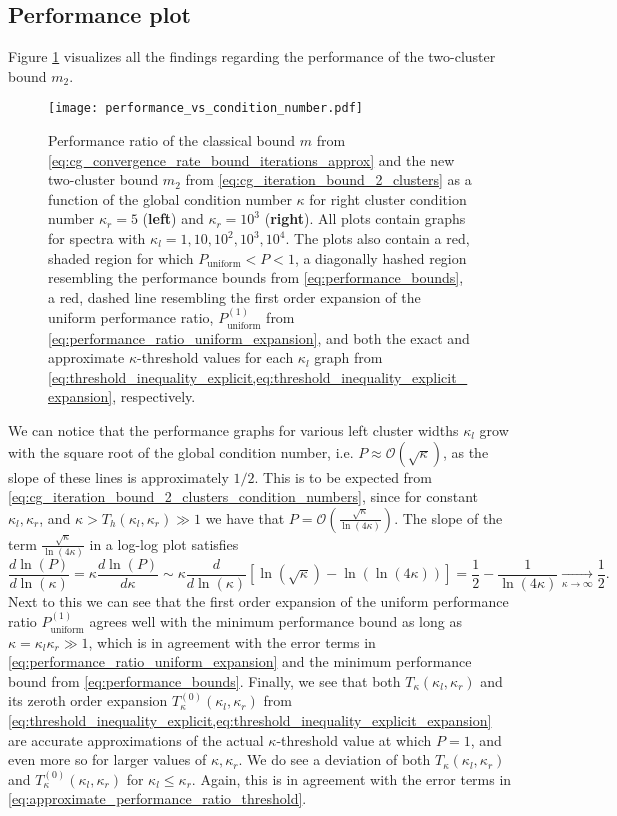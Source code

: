 \subsection{Performance plot}
Figure \ref{fig:two_cluster_bound_performance} visualizes all the findings regarding the performance of the two-cluster bound $m_2$. 
\begin{figure}[H]
    \centering
    \texttt{[image: performance\_vs\_condition\_number.pdf]}
    \caption{Performance ratio of the classical bound $m$ from \cref{eq:cg_convergence_rate_bound_iterations_approx} and the new two-cluster bound $m_2$ from \cref{eq:cg_iteration_bound_2_clusters} as a function of the global condition number $\kappa$ for right cluster condition number $\kappa_r = 5$ (\textbf{left}) and $\kappa_r = 10^3$ (\textbf{right}). All plots contain graphs for spectra with $\kappa_l = 1, 10, 10^2, 10^3, 10^4$. The plots also contain a red, shaded region for which $P_{\text{uniform}} < P < 1$, a diagonally hashed region resembling the performance bounds from \cref{eq:performance_bounds}, a red, dashed line resembling the first order expansion of the uniform performance ratio, $P^{(1)}_{\text{uniform}}$ from \cref{eq:performance_ratio_uniform_expansion}, and both the exact and approximate $\kappa$-threshold values for each $\kappa_l$ graph from \cref{eq:threshold_inequality_explicit,eq:threshold_inequality_explicit_expansion}, respectively.}
    \label{fig:two_cluster_bound_performance}
\end{figure}
We can notice that the performance graphs for various left cluster widths $\kappa_l$ grow with the square root of the global condition number, i.e. $P \approx \mathcal{O}(\sqrt{\kappa})$, as the slope of these lines is approximately $1/2$. This is to be expected from \cref{eq:cg_iteration_bound_2_clusters_condition_numbers}, since for constant $\kappa_l,\kappa_r$, and $\kappa > T_h(\kappa_l, \kappa_r) \gg 1$ we have that $P = \mathcal{O}\left(\frac{\sqrt{\kappa}}{\ln(4\kappa)}\right)$. The slope of the term $\frac{\sqrt{\kappa}}{\ln(4\kappa)}$ in a log-log plot satisfies
\[
    \frac{d\ln(P)}{d\ln(\kappa)} =\kappa\frac{d\ln(P)}{d\kappa} \sim \kappa\frac{d}{d\ln(\kappa)} \left[\ln(\sqrt{\kappa}) - \ln(\ln(4\kappa))\right] = \frac{1}{2} - \frac{1}{\ln(4\kappa)} \underset{\kappa\to\infty}{\longrightarrow} \frac{1}{2}.
\]
Next to this we can see that the first order expansion of the uniform performance ratio $P^{(1)}_{\text{uniform}}$ agrees well with the minimum performance bound as long as $\kappa = \kappa_l\kappa_r \gg 1$, which is in agreement with the error terms in \cref{eq:performance_ratio_uniform_expansion} and the minimum performance bound from \cref{eq:performance_bounds}. Finally, we see that both $T_{\kappa}(\kappa_l, \kappa_r)$ and its zeroth order expansion $T^{(0)}_{\kappa}(\kappa_l, \kappa_r)$ from \cref{eq:threshold_inequality_explicit,eq:threshold_inequality_explicit_expansion} are accurate approximations of the actual $\kappa$-threshold value at which $P=1$, and even more so for larger values of $\kappa,\kappa_r$. We do see a deviation of both $T_{\kappa}(\kappa_l, \kappa_r)$ and $T^{(0)}_{\kappa}(\kappa_l, \kappa_r)$ for $\kappa_l\leq\kappa_r$. Again, this is in agreement with the error terms in \cref{eq:approximate_performance_ratio_threshold}.

